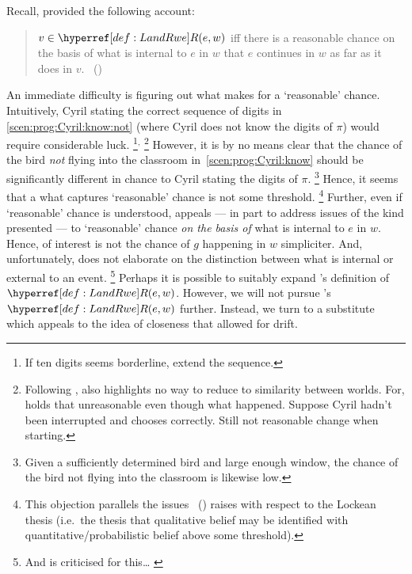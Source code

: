 \begin{note}
  Recall, \citeauthor{Landman:1992wh} provided the following account:
  \begin{quote}
    \(v \in \lRwe{w}{e}\) iff there is a reasonable chance on the basis of what is internal to \(e\) in \(w\) that \(e\) continues in \(w\) as far as it does in \(v\).%
    \mbox{ }\hfill\mbox{(\citeyear[26]{Landman:1992wh})}
  \end{quote}
  An immediate difficulty is figuring out what makes for a `reasonable' chance.
  Intuitively, Cyril stating the correct sequence of digits in \autoref{scen:prog:Cyril:know:not} (where Cyril does not know the digits of \(\pi\)) would require considerable luck.%
  \footnote{
    If ten digits seems borderline, extend the sequence.
  }\(^{,}\)%
  \footnote{
    Following \citeauthor{Landman:1992wh}, also highlights no way to reduce to similarity between worlds.
    For, \citeauthor{Landman:1992wh} holds that unreasonable even though what happened.
    Suppose Cyril hadn't been interrupted and chooses correctly.
    Still not reasonable change when starting.
  }
  However, it is by no means clear that the chance of the bird \emph{not} flying into the classroom in~\autoref{scen:prog:Cyril:know} should be significantly different in chance to Cyril stating the digits of \(\pi\).%
  \footnote{
    Given a sufficiently determined bird and large enough window, the chance of the bird not flying into the classroom is likewise low.
  }
  Hence, it seems that a what captures `reasonable' chance is not some threshold.%
  \footnote{
    This objection parallels the issues~\citeauthor{Foley:2009vl} (\citeyear{Foley:2009vl}) raises with respect to the Lockean thesis (i.e.~the thesis that qualitative belief may be identified with quantitative/probabilistic belief above some threshold).
  }
  Further, even if `reasonable' chance is understood, \citeauthor{Landman:1992wh} appeals --- in part to address issues of the kind presented --- to `reasonable' chance \emph{on the basis of} what is internal to \(e\) in \(w\).
  Hence, of interest is not the chance of \(g\) happening in \(w\) simpliciter.
  And, unfortunately, \citeauthor{Landman:1992wh} does not elaborate on the distinction between what is internal or external to an event.%
  \footnote{
    And is criticised for this\dots \textcite[35]{Szabo:2004ul} \textcite[203,fn.2]{Bonomi:1997uq} \textcite[49--50]{Engelberg:1999vi}
  }
  Perhaps it is possible to suitably expand \citeauthor{Landman:1992wh}'s definition of \(\lRwe{w}{e}\).
  However, we will not pursue \citeauthor{Landman:1992wh}'s \(\lRwe{w}{e}\) further.
  Instead, we turn to a substitute which appeals to the idea of closeness that allowed for drift.
\end{note}


